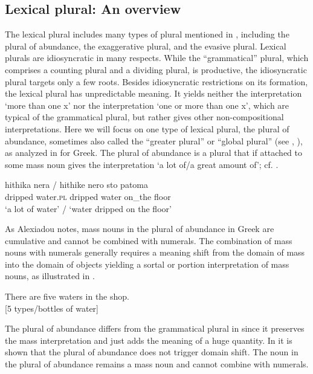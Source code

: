\documentclass[output=paper,colorlinks,citecolor=brown,
]{langscibook}
\begin{document}

\subsection{Lexical plural: An overview}\label{sec:4.2}

The lexical plural includes many types of plural mentioned in \citet{Corbett2000}, including the plural of abundance, the exaggerative plural, and the evasive plural. Lexical plurals are idiosyncratic in many respects. While the ``grammatical'' plural, which comprises a counting plural and a dividing plural, is productive, the idiosyncratic plural targets only a few roots. Besides idiosyncratic restrictions on its formation, the lexical plural has unpredictable meaning. It yields neither the interpretation `more than one x' nor the interpretation `one or more than one x', which are typical of the grammatical plural, but rather gives other non-compositional interpretations. Here we will focus on one type of lexical plural, the plural of abundance, sometimes also called the ``greater plural'' or ``global plural'' (see \citealt[30f.,]{Corbett2000}, \citealt[109ff.]{Acquaviva2008}), as analyzed in \citet{Alexiadou2011} for Greek. The plural of abundance is a plural that if attached to some mass noun gives the interpretation `a lot of/a great amount of'; cf. . 

\ea\label{ex:34}
\gll hithika nera / hithike nero sto patoma \\	
dripped water.\textsc{pl} {} dripped water on\_the floor \\
\glt `a lot of water' / `water dripped on the floor' \hfill \citep[Greek;][36]{Alexiadou2011}
\z

\noindent As Alexiadou notes, mass nouns in the plural of abundance in Greek are cumulative and cannot be combined with numerals. The combination of mass nouns with numerals generally requires a meaning shift from the domain of mass into the domain of objects yielding a sortal or portion interpretation of mass nouns, as illustrated in .

\ea\label{ex:35}	
There are five waters in the shop.\\ 
{[}5 types/bottles of water]
\z

\noindent The plural of abundance differs from the grammatical plural in  since it preserves the mass interpretation and just adds the meaning of a huge quantity. In  it is shown that the plural of abundance does not trigger domain shift. The noun in the plural of abundance remains a mass noun and cannot combine with numerals. 
\end{document}
